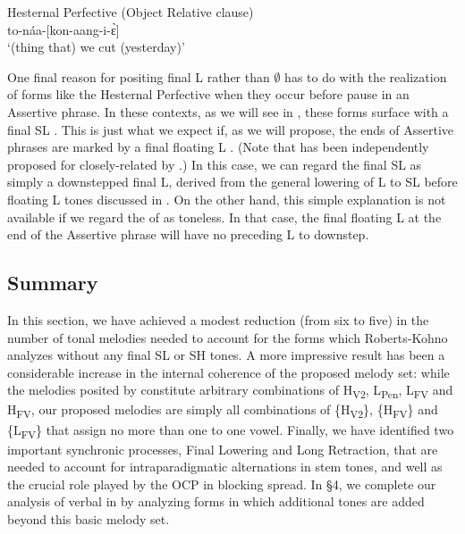 \documentclass[output=paper,newtxmath,modfonts,nonflat,draft]{langsci/langscibook}
\begin{document}
\ea\label{ex:jones:8}
Hesternal Perfective (Object Relative clause)\\
 to-náa-[kon-aang-i-\`ɛ]  \\
\glt ‘(thing that) we cut (yesterday)’
\z

One final reason for positing final L rather than ${\emptyset}$ has to do with the realization of forms like the Hesternal Perfective when they occur before pause in an Assertive phrase. In these contexts, as we will see in , these forms surface with a final SL . This is just what we expect if, as we will propose, the ends of Assertive phrases are marked by a final floating L . (Note that has been independently proposed for closely-related  by \citealt{Gjersoe2016}.) In this case, we can regard the final SL  as simply a downstepped final L, derived from the general lowering of L to SL before floating L tones discussed in . On the other hand, this simple explanation is not available if we regard the  of  as toneless. In that case, the final floating L  at the end of the {Assertive phrase} will have no preceding L  to downstep.

\subsection{Summary}\label{sec:jones:3.7}

In this section, we have achieved a modest reduction (from six to five) in the number of tonal melodies needed to account for the forms which Roberts-Kohno analyzes without any final SL or SH tones. A more impressive result has been a considerable increase in the internal coherence of the proposed melody set: while the melodies posited by \citet{Roberts-Kohno2014} constitute arbitrary combinations of H\textsubscript{V2}, L\textsubscript{Pen}, L\textsubscript{FV} and H\textsubscript{FV}, our proposed melodies are simply all combinations of \{H\textsubscript{V2}\}, \{H\textsubscript{FV}\} and \{L\textsubscript{FV}\} that assign no more than one  to one vowel. Finally, we have identified two important synchronic processes, Final Lowering and Long Retraction, that are needed to account for intraparadigmatic alternations in stem tones, and well as the crucial role played by the OCP in blocking  spread. In §4, we complete our analysis of verbal  in  by analyzing forms in which additional tones are added beyond this basic melody set.
\end{document}
